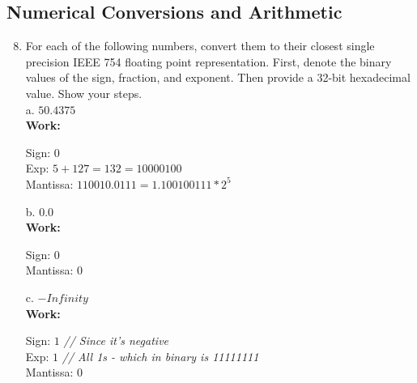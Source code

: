 \documentclass[11pt]{article}
\begin{document}
\subsection{Numerical Conversions and Arithmetic}
\begin{enumerate}
    \setcounter{enumi}{7}
    \item For each of the following numbers, convert them to their closest single precision IEEE 754
    floating point representation. First, denote the binary values of the sign, fraction, and exponent. Then provide a 32-bit hexadecimal value. Show your steps.\\
    a. $50.4375$\\
    \textbf{Work:}
    \begin{center}
        Sign: $0$\\
        Exp: $5 + 127 = 132 = 10000100$\\
        Mantissa: $110010.0111 = 1.100100111 * 2^5$\\
    \end{center}
    b. $0.0$\\
    \textbf{Work:}
    \begin{center}
        Sign: $0$\\
        Mantissa: $0$\\
    \end{center}
    c. \textit{$-Infinity$}\\
    \textbf{Work:}
    \begin{center}
        Sign: $1$ \textit{// Since it's negative}\\
        Exp: $1$ \textit{// All 1s - which in binary is 11111111}\\
        Mantissa: $0$\\

\end{center}
\end{enumerate}
\end{document}
